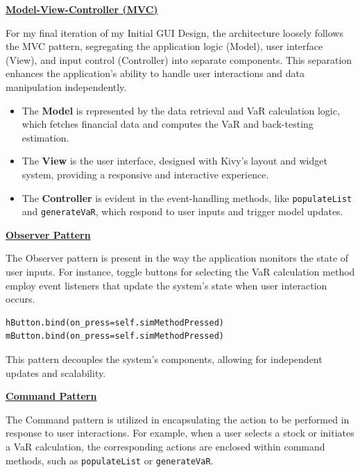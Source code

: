 \documentclass{article}
\begin{document}
\underline{\textbf{Model-View-Controller (MVC)}}\\\vspace{0.3cm}

For my final iteration of my Initial GUI Design, the architecture loosely follows the MVC pattern, segregating the application logic (Model), user interface (View), and input control (Controller) into separate components. This separation enhances the application's ability to handle user interactions and data manipulation independently.

\begin{itemize}
    \item The \textbf{Model} is represented by the data retrieval and VaR calculation logic, which fetches financial data and computes the VaR and back-testing estimation.
    \item The \textbf{View} is the user interface, designed with Kivy's layout and widget system, providing a responsive and interactive experience.
    \item The \textbf{Controller} is evident in the event-handling methods, like \texttt{populateList} and \texttt{generateVaR}, which respond to user inputs and trigger model updates.
\end{itemize}

\underline{\textbf{Observer Pattern}}\\\vspace{0.3cm}

The Observer pattern is present in the way the application monitors the state of user inputs. For instance, toggle buttons for selecting the VaR calculation method employ event listeners that update the system's state when user interaction occurs.

\begin{verbatim}
hButton.bind(on_press=self.simMethodPressed)
mButton.bind(on_press=self.simMethodPressed)
\end{verbatim}

This pattern decouples the system's components, allowing for independent updates and scalability.\\\vspace{0.3cm}

\underline{\textbf{Command Pattern}}\\\vspace{0.3cm}

The Command pattern is utilized in encapsulating the action to be performed in response to user interactions. For example, when a user selects a stock or initiates a VaR calculation, the corresponding actions are enclosed within command methods, such as \texttt{populateList} or \texttt{generateVaR}.
\end{document}
